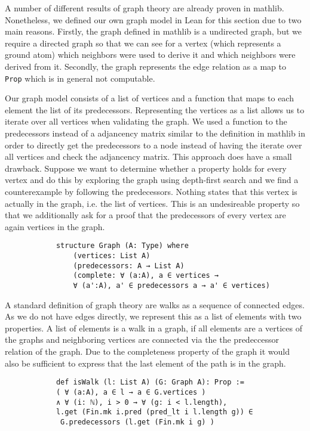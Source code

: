 \documentclass{article}
\begin{document}
        A number of different results of graph theory are already proven in mathlib. Nonetheless, we defined our own graph model in Lean for this section due to two main reasons. Firstly, the graph defined in mathlib is a undirected graph, but we require a directed graph so that we can see for a vertex (which represents a ground atom) which neighbors were used to derive it and which neighbors were derived from it. Secondly, the graph represents the edge relation as a map to \texttt{Prop} which is in general not computable.


        Our graph model consists of a list of vertices and a function that maps to each element the list of its predecessors. Representing the vertices as a list allows us to iterate over all vertices when validating the graph. We used a function to the predecessors instead of a adjancency matrix similar to the definition in mathlib in order to directly get the predecessors to a node instead of having the iterate over all vertices and check the adjancency matrix. This approach does have a small drawback. Suppose we want to determine whether a property holds for every vertex and do this by exploring the graph using depth-first search and we find a counterexample by following the predecessors. Nothing states that this vertex is actually in the graph, i.e. the list of vertices. This is an undesireable property so that we additionally ask for a proof that the predecessors of every vertex are again vertices in the graph.

        \begin{lstlisting}
            structure Graph (A: Type) where
                (vertices: List A)
                (predecessors: A → List A)
                (complete: ∀ (a:A), a ∈ vertices →  
                ∀ (a':A), a' ∈ predecessors a → a' ∈ vertices)
        \end{lstlisting}
        
        A standard definition of graph theory are walks as a sequence of connected edges. As we do not have edges directly, we represent this as a list of elements with two properties. A list of elements is a walk in a graph, if all elements are a vertices of the graphs and neighboring vertices are connected via the the predeccessor relation of the graph. Due to the completeness property of the graph it would also be sufficient to express that the last element of the path is in the graph. 

        \begin{lstlisting}
            def isWalk (l: List A) (G: Graph A): Prop :=
            ( ∀ (a:A), a ∈ l → a ∈ G.vertices ) 
            ∧ ∀ (i: ℕ), i > 0 → ∀ (g: i < l.length), 
            l.get (Fin.mk i.pred (pred_lt i l.length g)) ∈ 
             G.predecessors (l.get (Fin.mk i g) )
        \end{lstlisting}
\end{document}
